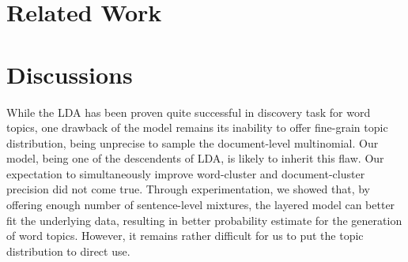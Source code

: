 % 
% 
% 


\section{Related Work} \label{s:related-work}   

\section{Discussions} \label{s:discussions}  

While the LDA has been proven quite successful in discovery task for word
topics, one drawback of the model remains its inability to offer fine-grain
topic distribution, being unprecise to sample the document-level multinomial.
Our model, being one of the descendents of LDA, is likely to inherit this flaw.
Our expectation to simultaneously improve word-cluster and document-cluster
precision did not come true.  Through experimentation, we showed that, by
offering enough number of sentence-level mixtures, the layered model can better
fit the underlying data, resulting in better probability estimate for the
generation of word topics.  However, it remains rather difficult for us to put
the topic distribution to direct use.  

